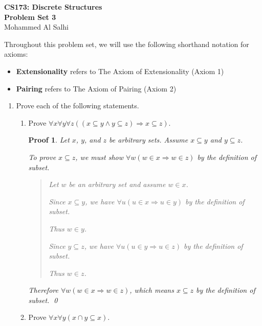 \documentclass[12pt]{article}
\theoremstyle{proofstyle}
\newtheorem*{proof*}{Proof}
\renewcommand{\maketitle}{%
  \begin{flushleft}
    {\Large\bfseries CS173: Discrete Structures}\\[0.3em]
    {\Large\bfseries Problem Set 3}\\[0.5em]
    {\normalsize Mohammed Al Salhi}
  \end{flushleft}
  \vspace{1em}
}
\begin{document}
\maketitle

\noindent
Throughout this problem set, we will use the following shorthand notation for axioms:
\begin{itemize}
    \item \textbf{Extensionality} refers to The Axiom of Extensionality (Axiom 1)
    \item \textbf{Pairing} refers to The Axiom of Pairing (Axiom 2)
\end{itemize}

\begin{enumerate}[left=0pt, itemsep=2em, parsep=1em]

\item Prove each of the following statements.

\begin{enumerate}[label=(\alph*), itemsep=1.5em, leftmargin=2em]

\item Prove $\forall x\forall y\forall z((x \subseteq y \wedge y \subseteq z) \Rightarrow x \subseteq z)$.

\begin{proof*}
    Let $x$, $y$, and $z$ be arbitrary sets. Assume $x \subseteq y$ and $y \subseteq z$.
    
    To prove $x \subseteq z$, we must show $\forall w(w \in x \Rightarrow w \in z)$ by the definition of subset.
    
    \begin{quote}
        Let $w$ be an arbitrary set and assume $w \in x$.
        
        Since $x \subseteq y$, we have $\forall u(u \in x \Rightarrow u \in y)$ by the definition of subset.
        
        Thus $w \in y$.
        
        Since $y \subseteq z$, we have $\forall u(u \in y \Rightarrow u \in z)$ by the definition of subset.
        
        Thus $w \in z$.
    \end{quote}
    
    Therefore $\forall w(w \in x \Rightarrow w \in z)$, which means $x \subseteq z$ by the definition of subset. \qed
\end{proof*}

\item Prove $\forall x\forall y(x \cap y \subseteq x)$.


\end{enumerate}
\end{enumerate}
\end{document}
